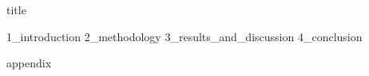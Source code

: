 \documentclass{article}
\begin{document}
{title}

\frontmatter

\renewcommand{\abstractname}{\LARGE Abstract}  %

\begin{abstract}
    {0_abstract}
\end{abstract}
\clearpage



\tableofcontents

\listoffigures
\listoftables

\mainmatter


\twocolumn
{1_introduction}
{2_methodology}
{3_results_and_discussion}
{4_conclusion}


\onecolumn
\newpage
%
\printbibliography

\addappendix
{appendix}


\end{document}
